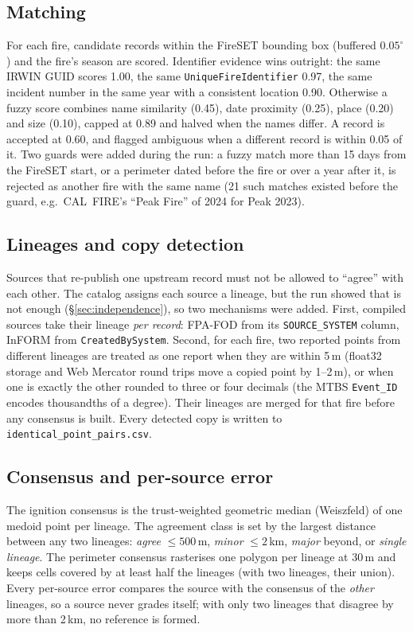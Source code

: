 \documentclass[11pt,a4paper]{article}
\begin{document}
\subsection{Matching}

For each fire, candidate records within the FireSET bounding box (buffered $0.05^\circ$) and the fire's season
are scored. Identifier evidence wins outright: the same IRWIN GUID scores 1.00, the same
\texttt{UniqueFireIdentifier} 0.97, the same incident number in the same year with a consistent location 0.90.
Otherwise a fuzzy score combines name similarity (0.45), date proximity (0.25), place (0.20) and size (0.10),
capped at 0.89 and halved when the names differ. A record is accepted at 0.60, and flagged ambiguous when a
different record is within 0.05 of it. Two guards were added during the run: a fuzzy match more than 15 days
from the FireSET start, or a perimeter dated before the fire or over a year after it, is rejected as another
fire with the same name (21 such matches existed before the guard, e.g.\ CAL~FIRE's ``Peak Fire'' of 2024 for
Peak 2023).

\subsection{Lineages and copy detection}
\label{sec:method-lineage}

Sources that re-publish one upstream record must not be allowed to ``agree'' with each other. The catalog
assigns each source a lineage, but the run showed that is not enough (\S\ref{sec:independence}), so two
mechanisms were added. First, compiled sources take their lineage \emph{per record}: FPA-FOD from its
\texttt{SOURCE\_SYSTEM} column, InFORM from \texttt{CreatedBySystem}. Second, for each fire, two reported points
from different lineages are treated as one report when they are within 5\,m (float32 storage and Web Mercator
round trips move a copied point by 1--2\,m), or when one is exactly the other rounded to three or four decimals
(the MTBS \texttt{Event\_ID} encodes thousandths of a degree). Their lineages are merged for that fire before any
consensus is built. Every detected copy is written to \texttt{identical\_point\_pairs.csv}.

\subsection{Consensus and per-source error}

The ignition consensus is the trust-weighted geometric median (Weiszfeld) of one medoid point per lineage. The
agreement class is set by the largest distance between any two lineages: \emph{agree} $\le 500$\,m,
\emph{minor} $\le 2$\,km, \emph{major} beyond, or \emph{single lineage}. The perimeter consensus rasterises one
polygon per lineage at 30\,m and keeps cells covered by at least half the lineages (with two lineages, their
union). Every per-source error compares the source with the consensus of the \emph{other} lineages, so a
source never grades itself; with only two lineages that disagree by more than 2\,km, no reference is formed.
\end{document}

